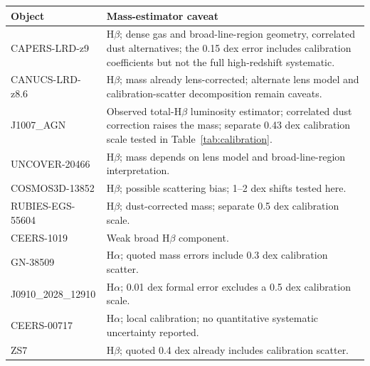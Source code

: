 \documentclass[pdflatex,sn-basic]{sn-jnl}
\begin{document}
\par\bigskip
\noindent\begin{minipage}{\textwidth}
\centering\small
{}
\begin{tabular}{@{}>{\raggedright\arraybackslash}p{}>{\raggedright\arraybackslash}p{}@{}}
\toprule
Object & Mass-estimator caveat \\
\midrule
CAPERS-LRD-z9 & H$\beta$; dense gas and broad-line-region geometry, correlated dust alternatives; the 0.15 dex error includes calibration coefficients but not the full high-redshift systematic. \\[3pt]
CANUCS-LRD-z8.6 & H$\beta$; mass already lens-corrected; alternate lens model and calibration-scatter decomposition remain caveats. \\[3pt]
J1007\_AGN & Observed total-H$\beta$ luminosity estimator; correlated dust correction raises the mass; separate 0.43 dex calibration scale tested in Table~\ref{tab:calibration}. \\[3pt]
UNCOVER-20466 & H$\beta$; mass depends on lens model and broad-line-region interpretation. \\[3pt]
COSMOS3D-13852 & H$\beta$; possible scattering bias; 1--2 dex shifts tested here. \\[3pt]
\mbox{RUBIES-EGS-55604} & H$\beta$; dust-corrected mass; separate 0.5 dex calibration scale. \\[3pt]
CEERS-1019 & Weak broad H$\beta$ component. \\[3pt]
GN-38509 & H$\alpha$; quoted mass errors include 0.3 dex calibration scatter. \\[3pt]
J0910\_2028\_12910 & H$\alpha$; 0.01 dex formal error excludes a 0.5 dex calibration scale. \\[3pt]
CEERS-00717 & H$\alpha$; local calibration; no quantitative systematic uncertainty reported. \\[3pt]
ZS7 & H$\beta$; quoted 0.4 dex already includes calibration scatter. \\[3pt]
\bottomrule
\end{tabular}
\label{tab:actions}
\end{minipage}
\end{document}
